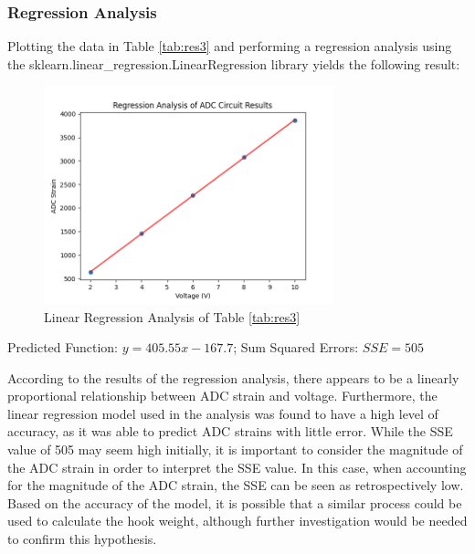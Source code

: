 \documentclass[12pt, a4paper]{article}
\begin{document}
\subsubsection{Regression Analysis}
Plotting the data in Table \ref{tab:res3} and performing a regression analysis using the sklearn.linear\_regression.LinearRegression library yields the following
result:
\begin{figure}[H]
    \centering
    \includegraphics[width=0.75\textwidth]{adc_graph.png}
    \caption{Linear Regression Analysis of Table \ref{tab:res3}}
    \label{fig:regr_test}
\end{figure}
\begin{center}
    Predicted Function: $y=405.55x-167.7$; 
    Sum Squared Errors: $SSE=505$
\end{center}
According to the results of the regression analysis, there appears to be a linearly proportional relationship between ADC strain and voltage. 
Furthermore, the linear regression model used in the analysis was found to have a high level of accuracy, as it was able to predict ADC strains with little error.
While the SSE value of 505 may seem high initially, it is important to consider the magnitude of the ADC strain in order to interpret the SSE value. 
In this case, when accounting for the magnitude of the ADC strain, the SSE can be seen as retrospectively low. 
Based on the accuracy of the model, it is possible that a similar process could be used to calculate the hook weight, 
although further investigation would be needed to confirm this hypothesis.



\newpage

\end{document}
